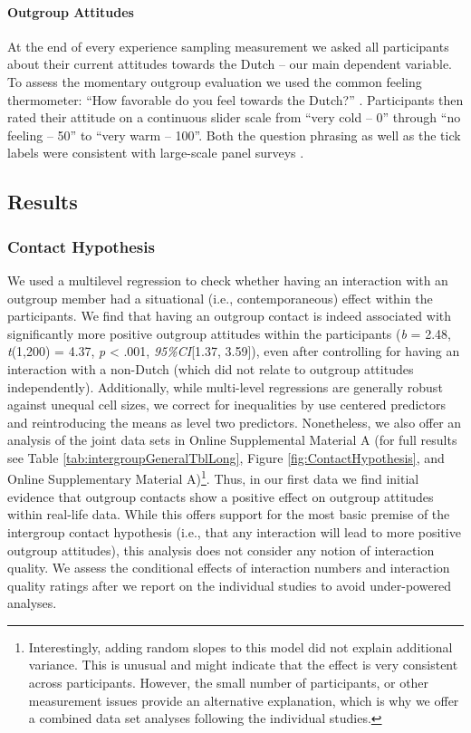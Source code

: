 \paragraph{Outgroup Attitudes}

At the end of every experience sampling measurement we asked all
participants about their current attitudes towards the Dutch -- our main
dependent variable. To assess the momentary outgroup evaluation we used
the common feeling thermometer: ``How favorable do you feel towards the
Dutch?'' \citep[][]{Lavrakas2008}. Participants then rated their
attitude on a continuous slider scale from ``very cold -- 0'' through
``no feeling -- 50'' to ``very warm -- 100''. Both the question phrasing
as well as the tick labels were consistent with large-scale panel
surveys \citep[e.g.,][]{DeBell2010}.

\subsection{Results}

\subsubsection{Contact Hypothesis}

We used a multilevel regression to check whether having an interaction
with an outgroup member had a situational (i.e., contemporaneous) effect
within the participants. We find that having an outgroup contact is
indeed associated with significantly more positive outgroup attitudes
within the participants (\textit{b} = 2.48, \textit{t}(1,200) = 4.37,
\textit{p} \textless{} .001, \textit{95\%CI}{[}1.37, 3.59{]}), even
after controlling for having an interaction with a non-Dutch (which did
not relate to outgroup attitudes independently). Additionally, while
multi-level regressions are generally robust against unequal cell sizes,
we correct for inequalities by use centered predictors and reintroducing
the means as level two predictors. Nonetheless, we also offer an
analysis of the joint data sets in Online Supplemental Material A (for
full results see Table \ref{tab:intergroupGeneralTblLong}, Figure
\ref{fig:ContactHypothesis}, and Online Supplementary Material
A)\footnote{Interestingly, adding random slopes to this model did not explain additional variance. This is unusual and might indicate that the effect is very consistent across participants. However, the small number of participants, or other measurement issues provide an alternative explanation, which is why we offer a combined data set analyses following the individual studies.}.
Thus, in our first data we find initial evidence that outgroup contacts
show a positive effect on outgroup attitudes within real-life data.
While this offers support for the most basic premise of the intergroup
contact hypothesis (i.e., that any interaction will lead to more
positive outgroup attitudes), this analysis does not consider any notion
of interaction quality. We assess the conditional effects of interaction
numbers and interaction quality ratings after we report on the
individual studies to avoid under-powered analyses.

